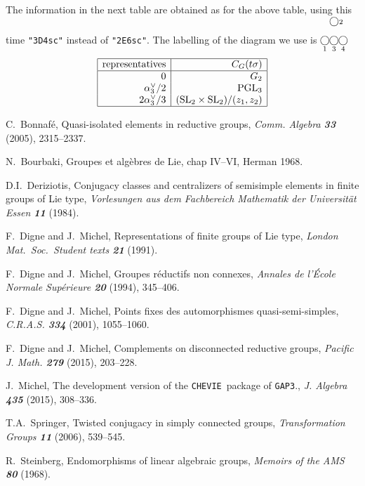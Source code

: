 \documentclass{amsart}
\numberwithin{equation}{section}
\theoremstyle{definition}
\theoremstyle{remark}
\newcommand\SL{\mathrm{SL}}
\newcommand\PGL{\mathrm{PGL}}
\newcommand\CHEVIE{{\tt CHEVIE}}
\newcommand\GAP{{\tt GAP3}}
\newcommand{\nnode}[1]{{\kern 4.5pt\hbox to
0pt{\hss{$\mathop\bigcirc\limits_{#1}$}\hss}\kern 4.4pt}}
\newcommand\edge{{\vrule width10pt height3pt depth-2pt}}
\newcommand\vertbar[2]{\rlap{\kern4pt\vrule width1pt height17.3pt depth-7.3pt}
 \rlap{\raise19.4pt\hbox{$\kern -0.4pt\bigcirc\scriptstyle#2$}}
                 \nnode{#1}}
\begin{document}
The information in the next table are obtained as for the above table, using
this time \verb+"3D4sc"+ instead of \verb+"2E6sc"+.
The labelling of the diagram we use is
$\nnode{1}\edge\vertbar{3}{2}\edge\nnode{4}$
$$\begin{array}{|r|r|}
\noalign{\hrule}
\text{representatives}&C_G(t\sigma)\\
\noalign{\hrule}
0&G_2\\
\alpha_3^\vee/2&\PGL_3\\
2\alpha_3^\vee/3&(\SL_2\times\SL_2)/(z_1,z_2)\\
\noalign{\hrule}
\end{array}
$$
\begin{thebibliography}{DM94}
C.~Bonnaf\'e, Quasi-isolated elements in reductive groups,
{\sl Comm. Algebra \bf 33} (2005), 2315--2337.

N.~Bourbaki, Groupes et alg\`ebres de Lie, chap IV--VI,
Herman 1968.


    D.I.~Deriziotis,   Conjugacy    classes    and
centralizers of semisimple elements in finite groups of Lie type,
{\sl 
Vorlesungen aus dem Fachbereich Mathematik der Universit\"at Essen \bf 11} (1984).

F.~Digne and J.~Michel, Representations of finite groups of Lie type, 
{\sl London Mat.\ Soc.\ Student texts \bf21} (1991).

F.~Digne and J.~Michel, Groupes r\'eductifs non connexes,
{\sl Annales de l'\'Ecole Normale Sup\'erieure \bf 20} (1994),
345--406.

F.~Digne and J.~Michel, Points fixes des automorphismes quasi-semi-simples,
{\sl C.R.A.S. \bf 334} (2001), 1055--1060.

 F.~Digne and J.~Michel,
Complements on disconnected reductive groups,
{\sl Pacific J. Math. \bf 279} (2015), 203--228.

 J.~Michel,
The development version of the \CHEVIE\ package of \GAP.,
{\sl J. Algebra \bf 435} (2015), 308--336.

 T.A.~Springer, Twisted conjugacy in simply connected groups,
{\sl Transformation Groups \bf 11} (2006), 539--545.

R.~Steinberg,
Endomorphisms of linear algebraic groups,
{\sl Memoirs of the AMS \bf 80} (1968).
\end{thebibliography}
\vfill\eject
\printindex
\end{document}
